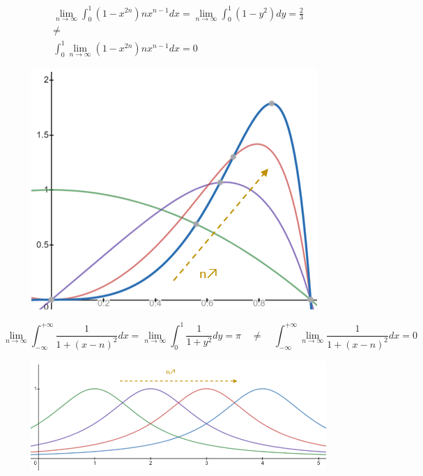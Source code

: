 \begin{example}
    \begin{minipage}[c]{.55\linewidth}
        \begin{equation*}
            \begin{array}{c}
                \lim\limits_{n\to\infty}\int_0^1(1-x^{2n})nx^{n-1}dx=\lim\limits_{n\to\infty}\int_0^1(1-y^2)dy=\frac{2}{3}\\[0.4cm]
                \neq\\[0.4cm]
                \int_0^1\lim\limits_{n\to\infty}(1-x^{2n})nx^{n-1}dx=0
            \end{array}
        \end{equation*}
    \end{minipage}
    \begin{minipage}[c]{.4\linewidth}
        \begin{figure}[H]
            \centering
            \includegraphics[scale = 0.6]{synthese_cm12_2.jpg}
        \end{figure}
    \end{minipage}
\end{example}

\begin{example}
    \begin{equation*}
        \lim_{n\to\infty}\int_{-\infty}^{+\infty}\frac{1}{1+(x-n)^2}dx=\lim_{n\to\infty}\int_0^1\frac{1}{1+y^2}dy=\pi \quad \neq\quad\int_{-\infty}^{+\infty}\lim_{n\to\infty}\frac{1}{1+(x-n)^2}dx=0
    \end{equation*}
    \begin{figure}[H]
        \centering
        \includegraphics[scale = 0.6]{synthese_cm12_3.jpg}
    \end{figure}
\end{example}


